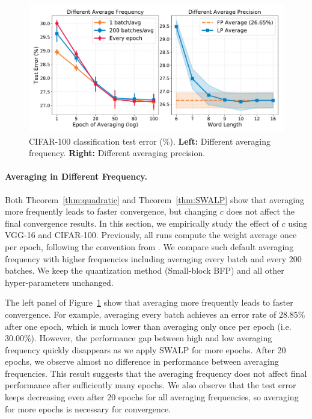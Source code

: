 \documentclass{article}
\begin{document}
\begin{figure}[t]
\centering
\includegraphics[width=\linewidth]{figures/diffc_qswa.pdf}
\caption{
CIFAR-100 classification test error (\%). \textbf{Left:} Different averaging frequency. \textbf{Right:} Different averaging precision.
}
\label{fig:diffc_qswa}
\vspace{-2mm}
\end{figure}


\paragraph{Averaging in Different Frequency.}
Both Theorem~\ref{thm:quadratic} and Theorem~\ref{thm:SWALP} show that averaging more frequently leads to faster convergence, but changing $c$ does not affect the final convergence results. 
In this section, we empirically study the effect of $c$ using VGG-16 and CIFAR-100.
Previously, all runs compute the weight average once per epoch, following the convention from \citet{SWA}. 
We compare such default averaging frequency with higher frequencies including averaging every batch and every 200 batches. 
We keep the quantization method (Small-block BFP) and all other hyper-parameters unchanged.

The left panel of Figure~\ref{fig:diffc_qswa} show that averaging more frequently leads to faster convergence. 
For example, averaging every batch achieves an error rate of $28.85\%$ after one epoch, which is much lower than averaging only once per epoch (i.e. $30.00\%$).
However, the performance gap between high and low averaging frequency quickly disappears as we apply SWALP for more epochs. 
After 20 epochs, we observe almost no difference in performance between averaging frequencies. 
This result suggests that the averaging frequency does not affect final performance after sufficiently many epochs. 
We also observe that the test error keeps decreasing even after 20 epochs for all averaging frequencies, so averaging for more epochs is necessary for convergence.
\end{document}
